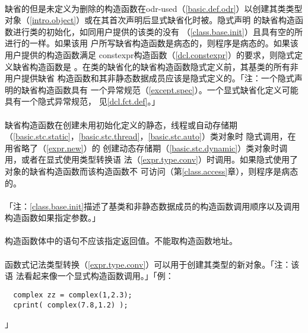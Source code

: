 \paragraph{}
缺省的但是未定义为删除的构造函数在odr-used（\ref{basic.def.odr}）以创建其类类型
对象（\ref{intro.object}）或在其首次声明后显式缺省化时被。隐式声明
的缺省构造函数进行类的初始化，如同用户提供的该类的没有
（\ref{class.base.init}）且具有空的所进行的一样。如果该用
户所写缺省构造函数是病态的，则程序是病态的。如果该用户提供的构造函数满足
constexpr构造函数（\ref{dcl.constexpr}）的要求，则隐式定义缺省构造函数是
。在类的缺省化的缺省构造函数隐式定义前，其基类的所有非用户提供缺省
构造函数和其非静态数据成员应该是隐式定义的。「注：一个隐式声明的缺省构造函数具有
一个异常规范（\ref{except.spec}）。一个显式缺省化定义可能具有一个隐式异常规范，
见\ref{dcl.fct.def}。」

\paragraph{}
缺省构造函数在创建未用初始化定义的静态，线程或自动存储期
（\ref{basic.stc.static}，\ref{basic.stc.thread}，\ref{basic.stc.auto}）类对象时
隐式调用，在用省略了（\ref{expr.new}）的
创建动态存储期（\ref{basic.stc.dynamic}）类对象时调用，或者在显式使用类型转换语
法（\ref{expr.type.conv}）时调用。如果隐式使用了对象的缺省构造函数而该构造函数不
可访问（第\ref{class.access}章），则程序是病态的。

\paragraph{}
「注：\ref{class.base.init}描述了基类和非静态数据成员的构造函数调用顺序以及调用
构造函数如果指定参数。」

\paragraph{}
构造函数体中的语句不应该指定返回值。不能取构造函数地址。

\paragraph{}
函数式记法类型转换（\ref{expr.type.conv}）可以用于创建其类型的新对象。「注：该语
法看起来像一个显式构造函数调用。」「例：
\begin{lstlisting}
  complex zz = complex(1,2.3);
  cprint( complex(7.8,1.2) );
\end{lstlisting}」

